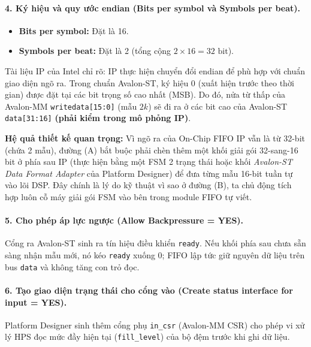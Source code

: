 \paragraph{4. Ký hiệu và quy ước endian (Bits per symbol và Symbols per beat).}
\begin{itemize}[leftmargin=1.5em, itemsep=2pt]
    \item \textbf{Bits per symbol:} Đặt là 16.
    \item \textbf{Symbols per beat:} Đặt là 2 (tổng cộng $2 \times 16 = 32\text{ bit}$).
\end{itemize}
Tài liệu IP của Intel chỉ rõ: IP thực hiện chuyển đổi endian để phù hợp với chuẩn giao diện ngõ ra. Trong chuẩn Avalon-ST, ký hiệu 0 (xuất hiện trước theo thời gian) được đặt tại các bit trọng số cao nhất (MSB). Do đó, nửa từ thấp của Avalon-MM \texttt{writedata[15:0]} (mẫu $2k$) sẽ đi ra ở các bit cao của Avalon-ST \texttt{data[31:16]} \textbf{(phải kiểm trong mô phỏng IP)}.

\textbf{Hệ quả thiết kế quan trọng:} Vì ngõ ra của On-Chip FIFO IP vẫn là từ 32-bit (chứa 2 mẫu), đường (A) bắt buộc phải chèn thêm một khối giải gói 32-sang-16 bit ở phía sau IP (thực hiện bằng một FSM 2 trạng thái hoặc khối \emph{Avalon-ST Data Format Adapter} của Platform Designer) để đưa từng mẫu 16-bit tuần tự vào lõi DSP. Đây chính là lý do kỹ thuật vì sao ở đường (B), ta chủ động tích hợp luôn cỗ máy giải gói FSM vào bên trong module FIFO tự viết.

\paragraph{5. Cho phép áp lực ngược (Allow Backpressure = YES).}
Cổng ra Avalon-ST sinh ra tín hiệu điều khiển \texttt{ready}. Nếu khối phía sau chưa sẵn sàng nhận mẫu mới, nó kéo \texttt{ready} xuống 0; FIFO lập tức giữ nguyên dữ liệu trên bus \texttt{data} và không tăng con trỏ đọc.

\paragraph{6. Tạo giao diện trạng thái cho cổng vào (Create status interface for input = YES).}
Platform Designer sinh thêm cổng phụ \texttt{in\_csr} (Avalon-MM CSR) cho phép vi xử lý HPS đọc mức đầy hiện tại (\texttt{fill\_level}) của bộ đệm trước khi ghi dữ liệu.

